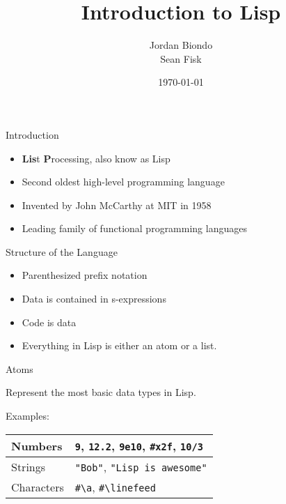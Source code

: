 \documentclass{beamer}
\title[Lisp Introduction]{Introduction to Lisp}
\author{Jordan Biondo \\ Sean Fisk}
\institute{Grand Valley State University}
\date{\today}
\begin{document}
\begin{frame}
\titlepage
\end{frame}


\begin{frame}{Introduction}
  \begin{itemize}
  \item \textbf{Lis}t \textbf{P}rocessing, also know as Lisp
  \item Second oldest high-level programming language
  \item Invented by John McCarthy at MIT in 1958
  \item Leading family of functional programming languages
  \end{itemize}
\end{frame}

\begin{frame}{Structure of the Language}
\begin{itemize}
\item Parenthesized prefix notation
\item Data is contained in s-expressions
\item Code is data
\item Everything in Lisp is either an atom or a list.
\end{itemize}

\end{frame}{Atoms}

Represent the most basic data types in Lisp.

Examples:

\begin{tabu}{| X | X |}
  \hline
  Numbers & \texttt{9}, \texttt{12.2}, \texttt{9e10}, \texttt{\#x2f}, \texttt{10/3} \\ \hline
  Strings & \texttt{"Bob"}, \texttt{"Lisp is awesome"} \\ \hline
  Characters & \texttt{\#\textbackslash{}a}, \texttt{\#\textbackslash{}linefeed} \\ \hline
\end{tabu}
\end{document}
